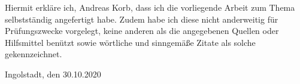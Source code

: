 \makeatletter
Hiermit erkläre ich, Andreas Korb, dass ich die vorliegende Arbeit zum Thema
\textit{\@title} selbstständig angefertigt habe. Zudem habe ich diese nicht anderweitig für Prüfungszwecke vorgelegt, keine anderen als die angegebenen Quellen oder Hilfsmittel benützt sowie wörtliche und sinngemäße Zitate als solche gekennzeichnet.
\vspace{3cm}

Ingolstadt, den 30.10.2020
\makeatother
